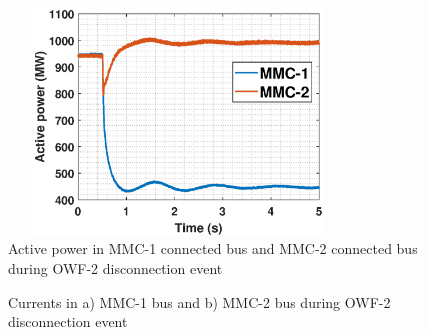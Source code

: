 \begin{figure}[H]
\centering
    \includegraphics[height = 6cm,width = 9cm]{Diagrams/Chapter_5/P_MMC_1_2_WT2off.eps}
    \caption{Active power in MMC-1 connected bus and MMC-2 connected bus during OWF-2 disconnection event}
    \label{P_MMC_1_2_WT2off}
\end{figure}

\begin{figure}[H]
\hspace*{-1.2cm}

\hspace*{-1.2cm}

\caption{Currents in a) MMC-1 bus and b) MMC-2 bus during OWF-2 disconnection event}
\label{fig:IABC_MMC_1_2_WT2off}
\end{figure}


